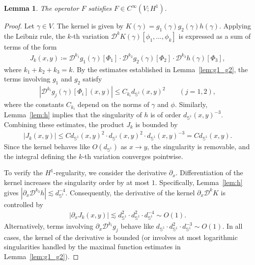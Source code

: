 \documentclass{article}
\newtheorem{lemma}[theorem]{Lemma}
\theoremstyle{remark}
\theoremstyle{definition}
\numberwithin{equation}{section}
\begin{document}
\begin{lemma}
    \label{lem:F}
    The operator $F$ satisfies $F \in C^\infty(V; H^1)$.
\end{lemma}

\begin{proof}
    Let $\gamma \in V$. The kernel is given by $K(\gamma) = g_1(\gamma) g_2(\gamma) h(\gamma)$.
    Applying the Leibniz rule, the $k$-th variation $\mathcal{D}^k K(\gamma)[\phi_1, \ldots, \phi_k]$ is expressed as a sum of terms of the form
    \begin{align*}
        J_k(x,y) \coloneqq \mathcal{D}^{k_1} g_1(\gamma)[\Phi_1] \cdot \mathcal{D}^{k_2} g_2(\gamma)[\Phi_2] \cdot \mathcal{D}^{k_3} h(\gamma)[\Phi_3],
    \end{align*}
    where $k_1+k_2+k_3=k$.
    By the estimates established in Lemma~\ref{lem:g1_g2}, the terms involving $g_1$ and $g_2$ satisfy
    \begin{align*}
        |\mathcal{D}^{k_i} g_j(\gamma)[\Phi_i](x,y)| \le C_{k_i} d_{\mathbb{S}^1}(x,y)^2 \qquad (j=1,2),
    \end{align*}
    where the constants $C_{k_i}$ depend on the norms of $\gamma$ and $\phi$.
    Similarly, Lemma~\ref{lem:h} implies that the singularity of $h$ is of order $d_{\mathbb{S}^1}(x,y)^{-3}$.
    Combining these estimates, the product $J_k$ is bounded by
    \begin{align*}
        |J_k(x,y)| \le C d_{\mathbb{S}^1}(x,y)^2 \cdot d_{\mathbb{S}^1}(x,y)^2 \cdot d_{\mathbb{S}^1}(x,y)^{-3} = C d_{\mathbb{S}^1}(x,y).
    \end{align*}
    Since the kernel behaves like $O(d_{\mathbb{S}^1})$ as $x \to y$, the singularity is removable, and the integral defining the $k$-th variation converges pointwise.

    To verify the $H^1$-regularity, we consider the derivative $\partial_x$.
    Differentiation of the kernel increases the singularity order by at most $1$. Specifically, Lemma~\ref{lem:h} gives $|\partial_x \mathcal{D}^{k_3} h| \lesssim d_{\mathbb{S}^1}^{-4}$.
    Consequently, the derivative of the kernel $\partial_x \mathcal{D}^k K$ is controlled by
    \begin{align*}
        |\partial_x J_k(x,y)| \lesssim d_{\mathbb{S}^1}^2 \cdot d_{\mathbb{S}^1}^2 \cdot d_{\mathbb{S}^1}^{-4} \sim O(1).
    \end{align*}
    Alternatively, terms involving $\partial_x \mathcal{D}^{k_i} g_j$ behave like $d_{\mathbb{S}^1} \cdot d_{\mathbb{S}^1}^2 \cdot d_{\mathbb{S}^1}^{-3} \sim O(1)$.
    In all cases, the kernel of the derivative is bounded (or involves at most logarithmic singularities handled by the maximal function estimates in Lemma~\ref{lem:g1_g2}).
    

\end{proof}
\end{document}
